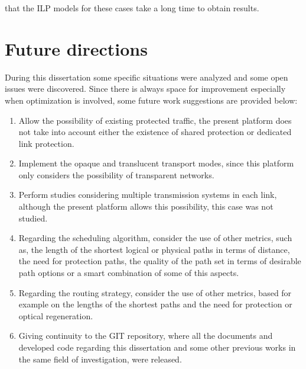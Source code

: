 that the ILP models for these cases take a long time to obtain results.


\section{Future directions}
\label{future}

During this dissertation some specific situations were analyzed and some open issues were discovered. Since there is always space for improvement especially when optimization is involved, some future work suggestions are provided below:
\begin{enumerate}
    \item Allow the possibility of existing protected traffic, the present platform does not take into account either the existence of shared protection or dedicated link protection.
    \item Implement the opaque and translucent transport modes, since this platform only considers the possibility of transparent networks.
    \item Perform studies considering multiple transmission systems in each link, although the present platform allows this possibility, this case was not studied.
    \item Regarding the scheduling algorithm, consider the use of other metrics, such as, the length of the shortest logical or physical paths in terms of distance, the need for protection paths, the quality of the path set in terms of desirable path options or a smart combination of some of this aspects.
    \item Regarding the routing strategy, consider the use of other metrics, based for example on the lengths of the shortest paths and the need for protection or optical regeneration.
    \item Giving continuity to the GIT repository, where all the documents and developed code regarding this dissertation and some other previous works in the same field of investigation, were released.
\end{enumerate}

\cleardoublepage
